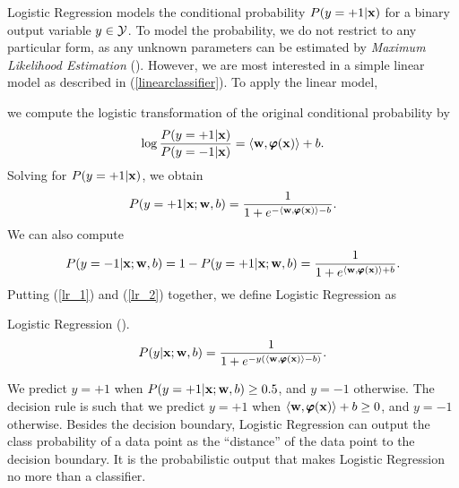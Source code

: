 {Logistic Regression models the conditional probability $P(y=+1|\mathbf {x})$ for a binary output variable $y\in\mathcal{Y}$.
To model the probability, we do not restrict to any particular form, as any unknown parameters can be estimated by \textit{Maximum Likelihood Estimation} (\mle).
However, we are most interested in a simple linear model as described in (\ref{linearclassifier}).
To apply the linear model,

we compute the logistic transformation of the original conditional probability by
\begin{align*}
	\log\frac{P(y=+1|\mathbf {x})}{P(y=-1|\mathbf {x})} = \langle \mathbf {w}, \pmb \varphi(\mathbf {x}) \rangle + b.
\end{align*}
Solving for $P(y=+1|\mathbf {x})$, we obtain
\begin{align}
	P(y=+1|\mathbf {x};\mathbf {w},b) = \frac{1}{1+e^{ -\langle \mathbf {w}, \pmb \varphi(\mathbf {x}) \rangle-b }}. \label{lr_1}
\end{align}
We can also compute
\begin{align}
	P(y=-1|\mathbf {x};\mathbf {w},b)=1-P(y=+1|\mathbf {x};\mathbf {w},b)=\frac{1}{1+e^{ \langle \mathbf {w}, \pmb \varphi(\mathbf {x}) \rangle+b }}. \label{lr_2}
\end{align}
Putting (\ref{lr_1}) and (\ref{lr_2}) together, we define Logistic Regression as
\begin{definition}{Logistic Regression (\lr).} \label{logistic_regression}
	\begin{align*}
		P(y|\mathbf {x};\mathbf {w},b) = \frac{1}{1+e^{ -y(\langle \mathbf {w}, \pmb \varphi(\mathbf {x}) \rangle-b) }}.
	\end{align*}
\end{definition}
\noindent
We predict $y=+1$ when $P(y=+1|\mathbf {x};\mathbf {w},b)\ge0.5$, and $y=-1$ otherwise.
The decision rule is such that we predict $y=+1$ when $\langle \mathbf {w}, \pmb \varphi(\mathbf {x}) \rangle+b\ge0$, and $y=-1$ otherwise.
Besides the decision boundary, Logistic Regression can output the class probability of a data point as the ``distance'' of the data point to the decision boundary.
It is the probabilistic output that makes Logistic Regression no more than a classifier.

}
